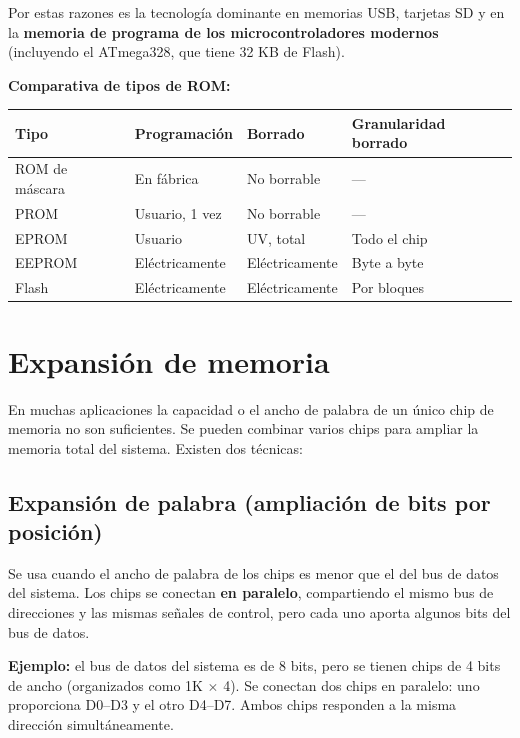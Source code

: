 Por estas razones es la tecnología dominante en memorias USB, tarjetas SD y en la \textbf{memoria de programa de los microcontroladores modernos} (incluyendo el ATmega328, que tiene 32 KB de Flash).

\textbf{Comparativa de tipos de ROM:}

\begin{table}[H]
\centering
\begin{tabular}{llll}
\toprule
Tipo & Programación & Borrado & Granularidad borrado \\
\midrule
ROM de máscara & En fábrica & No borrable & --- \\
PROM & Usuario, 1 vez & No borrable & --- \\
EPROM & Usuario & UV, total & Todo el chip \\
EEPROM & Eléctricamente & Eléctricamente & Byte a byte \\
Flash & Eléctricamente & Eléctricamente & Por bloques \\
\bottomrule
\end{tabular}
\end{table}

\section{Expansión de memoria}

En muchas aplicaciones la capacidad o el ancho de palabra de un único chip de memoria no son suficientes. Se pueden combinar varios chips para ampliar la memoria total del sistema. Existen dos técnicas:

\subsection{Expansión de palabra (ampliación de bits por posición)}

Se usa cuando el ancho de palabra de los chips es menor que el del bus de datos del sistema. Los chips se conectan \textbf{en paralelo}, compartiendo el mismo bus de direcciones y las mismas señales de control, pero cada uno aporta algunos bits del bus de datos.

\textbf{Ejemplo:} el bus de datos del sistema es de 8 bits, pero se tienen chips de 4 bits de ancho (organizados como 1K $\times$ 4). Se conectan dos chips en paralelo: uno proporciona D0--D3 y el otro D4--D7. Ambos chips responden a la misma dirección simultáneamente.


